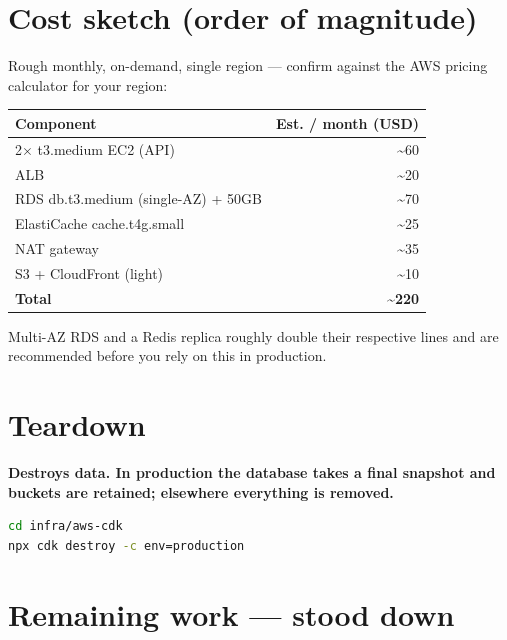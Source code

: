\documentclass[11pt,a4paper]{article}
\newcommand{\warnbox}[1]{%
  \begingroup
  \setlength{\fboxsep}{8pt}%
  \noindent\colorbox{warnbg}{\parbox{\dimexpr\linewidth-2\fboxsep}{%
  \color{warnframe}\bfseries #1}}%
  \endgroup\par\vspace{6pt}
}
\begin{document}
\section{Cost sketch (order of magnitude)}

Rough monthly, on-demand, single region --- confirm against the AWS pricing
calculator for your region:

\begin{center}
\begin{tabular}{@{}lr@{}}
\toprule
\textbf{Component} & \textbf{Est. / month (USD)} \\
\midrule
2$\times$ t3.medium EC2 (API)        & \textasciitilde{}60 \\
ALB                                  & \textasciitilde{}20 \\
RDS db.t3.medium (single-AZ) + 50GB  & \textasciitilde{}70 \\
ElastiCache cache.t4g.small          & \textasciitilde{}25 \\
NAT gateway                          & \textasciitilde{}35 \\
S3 + CloudFront (light)              & \textasciitilde{}10 \\
\midrule
\textbf{Total}                       & \textbf{\textasciitilde{}220} \\
\bottomrule
\end{tabular}
\end{center}

Multi-AZ RDS and a Redis replica roughly double their respective lines and are
recommended before you rely on this in production.

\section{Teardown}

\warnbox{Destroys data. In production the database takes a final snapshot and
buckets are retained; elsewhere everything is removed.}

\begin{lstlisting}[language=bash]
cd infra/aws-cdk
npx cdk destroy -c env=production
\end{lstlisting}

\section{Remaining work --- stood down}
\end{document}
